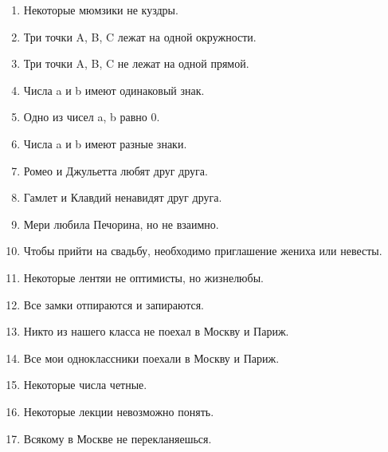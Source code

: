 \documentclass[12pt]{extreport}
\begin{document}
\begin{enumerate}
\item Некоторые мюмзики не куздры.
\item Три точки A, B, C лежат на одной окружности.
\item Три точки A, B, C не лежат на одной прямой.
\item Числа a и b имеют одинаковый знак.
\item Одно из чисел a, b равно 0.
\item Числа a и b имеют разные знаки.
\item Ромео и Джульетта любят друг друга.
\item Гамлет и Клавдий ненавидят друг друга.
\item Мери любила Печорина, но не взаимно.
\item Чтобы прийти на свадьбу, необходимо приглашение жениха или невесты.
\item Некоторые лентяи не оптимисты, но жизнелюбы.
\item Все замки отпираются и запираются.
\item Никто из нашего класса не поехал в Москву и Париж.
\item Все мои одноклассники поехали в Москву и Париж.
\item Некоторые числа четные.
\item Некоторые лекции невозможно понять.
\item Всякому в Москве не перекланяешься.
\end{enumerate}
\end{document}

